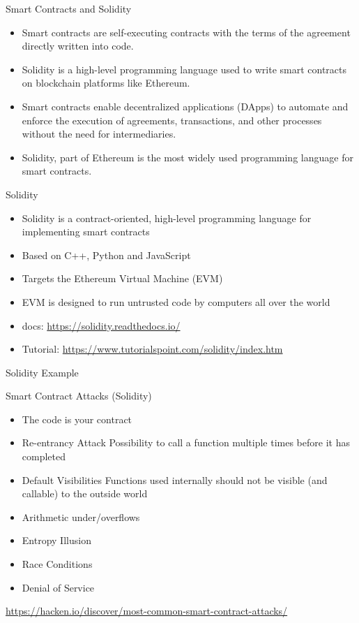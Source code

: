 \begin{frame}{Smart Contracts and Solidity}
    \begin{itemize}
        \item Smart contracts are self-executing contracts with the terms of the agreement directly written into code.
        \item Solidity is a high-level programming language used to write smart contracts on blockchain platforms like Ethereum.
        \item Smart contracts enable decentralized applications (DApps) to automate and enforce the execution of agreements, transactions, and other processes without the need for intermediaries.
        \item Solidity, part of Ethereum is the most widely used programming language for smart contracts.
    \end{itemize}
\end{frame}

\begin{frame}{Solidity}
    \begin{itemize}
        \item Solidity is a contract-oriented, high-level programming language for implementing smart contracts
        \item Based on C++, Python and JavaScript
        \item Targets the Ethereum Virtual Machine (EVM)
        \item EVM is designed to run untrusted code by computers all over the world
        \item docs: \url{https://solidity.readthedocs.io/}
        \item Tutorial: \url{https://www.tutorialspoint.com/solidity/index.htm}
    \end{itemize}
\end{frame}

\begin{frame}{Solidity Example}

\end{frame}


\begin{frame}{Smart Contract Attacks (Solidity)}
    \begin{itemize}
        \item The code is your contract
        \item Re-entrancy Attack
              Possibility to call a function multiple times before it has completed
        \item Default Visibilities
              Functions used internally should not be visible (and callable) to the outside world
        \item Arithmetic under/overflows
        \item Entropy Illusion
        \item Race Conditions
        \item Denial of Service
    \end{itemize}
    \url{https://hacken.io/discover/most-common-smart-contract-attacks/}
\end{frame}

